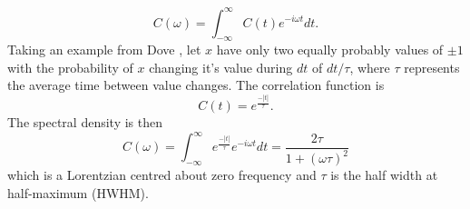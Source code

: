 %
\begin{equation}
C(\omega)=\int_{-\infty}^{\infty}C(t)e^{-i\omega t}dt.
\end{equation}
%
Taking an example from Dove \cite{dove}, let $x$ have only two equally probably values of $\pm 1$ with the probability of $x$ changing it's value during $dt$ of $dt/\tau$, where $\tau$ represents the average time between value changes. The correlation function is
%
\begin{equation}
C(t)=e^{\frac{-|t|}{\tau}}.
\end{equation}
%
The spectral density is then
\begin{equation}
C(\omega)=\int_{-\infty}^{\infty}e^{\frac{-|t|}{\tau}}e^{-i\omega t}dt=\frac{2\tau}{1+(\omega \tau )^2}
\end{equation}
which is a Lorentzian centred about zero frequency and $\tau$ is the half width at half-maximum (HWHM).

